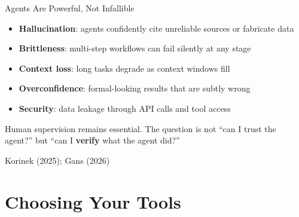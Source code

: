 \documentclass[aspectratio=169, 11pt]{beamer}
\newcommand{\emphgold}[1]{\alert{\textbf{#1}}}
\newcommand{\sourceref}[1]{\vspace{0.15cm}\hfill{\tiny\textcolor{medgray}{#1}}}
\begin{document}
\begin{frame}[shrink=5]{Agents Are Powerful, Not Infallible}
\begin{warningbox}
\begin{itemize}
  \item \textbf{Hallucination}: agents confidently cite unreliable sources or fabricate data
  \item \textbf{Brittleness}: multi-step workflows can fail silently at any stage
  \item \textbf{Context loss}: long tasks degrade as context windows fill
  \item \textbf{Overconfidence}: formal-looking results that are subtly wrong
  \item \textbf{Security}: data leakage through API calls and tool access
\end{itemize}
\end{warningbox}
\vspace{0.5cm}
\begin{bigquote}
\large
Human supervision remains essential. The question is not ``can I trust the agent?'' but ``can I \emphgold{verify} what the agent did?''
\end{bigquote}
\sourceref{Korinek (2025); Gans (2026)}
\end{frame}

\section{Choosing Your Tools}
\end{document}
